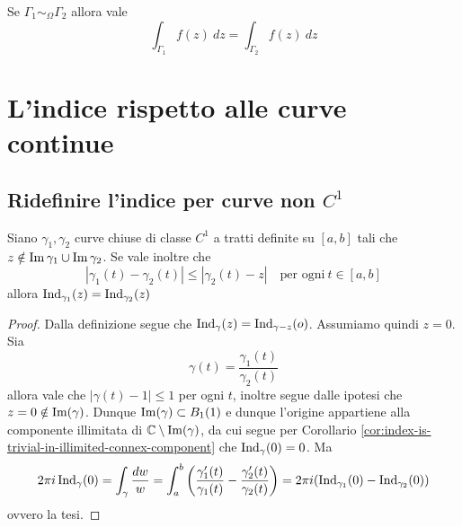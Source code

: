 \begin{corollary}
  Se $\Gamma_1 \sim_\Omega \Gamma_2$ allora vale
  \begin{equation*}
    \int_{\Gamma_1}f(z) \ dz = \int_{\Gamma_2 } f(z)\ dz
  \end{equation*}
  \label{cor:uguaglianza-catene-per-integrali}
\end{corollary}

\section{L'indice rispetto alle curve continue}
\subsection{\textcolor{AnComp}{\textbf{Ridefinire l'indice per curve non $C^1$}}}

\begin{lemma}
    Siano $\gamma_1, \gamma_2$ curve chiuse di classe $C^1$ a tratti definite su
    $\left[ a,b \right]$ tali che $z \notin \operatorname{Im}{\gamma_1} \cup
    \operatorname{Im}{\gamma_2}$. Se vale inoltre che 
    \begin{equation*}
        |\gamma_1(t) - \gamma_2(t)| \le |\gamma_2(t) -z| \quad \text{per
        ogni}\ t \in \left[ a,b \right]
    \end{equation*}
    allora $\operatorname{Ind}_{\gamma_1}(z)
    = \operatorname{Ind}_{\gamma_2}(z)$
    \label{lem:stesso-indice-curve-vicine-in-punto}
\end{lemma}
\begin{proof}
 Dalla definizione segue che $\operatorname{Ind}_\gamma(z)
 = \operatorname{Ind}_{\gamma - z}(o)$. %
 Assumiamo quindi $z = 0$. Sia 
 \begin{equation*}
   \gamma(t) = \frac{\gamma_1(t)}{\gamma_2(t)}
 \end{equation*}
 allora vale che $|\gamma(t) - 1| \le 1$ per ogni $t$, inoltre segue dalle
 ipotesi che $z=0 \notin \operatorname{Im}(\gamma)$. Dunque $\operatorname{Im}(\gamma) \subset
 B_{1}(1)$ e dunque l'origine appartiene alla componente illimitata di $\mathbb{C}
 \setminus \operatorname{Im}(\gamma)$, da cui segue per Corollario
 \ref{cor:index-is-trivial-in-illimited-connex-component} che
 $\operatorname{Ind}_\gamma(0) = 0$. Ma 
 \begin{equation*}
   2\pi i \operatorname{Ind}_\gamma(0) = \int_\gamma \frac{dw}{w} = \int_a^b
   \left( \frac{\gamma'_1(t)}{\gamma_1(t)}
   - \frac{\gamma'_2(t)}{\gamma_2(t)}\right) = 2\pi
   i (\operatorname{Ind}_{\gamma_1}(0) - \operatorname{Ind}_{\gamma_2}(0))
 \end{equation*}
 ovvero la tesi.
\end{proof}

